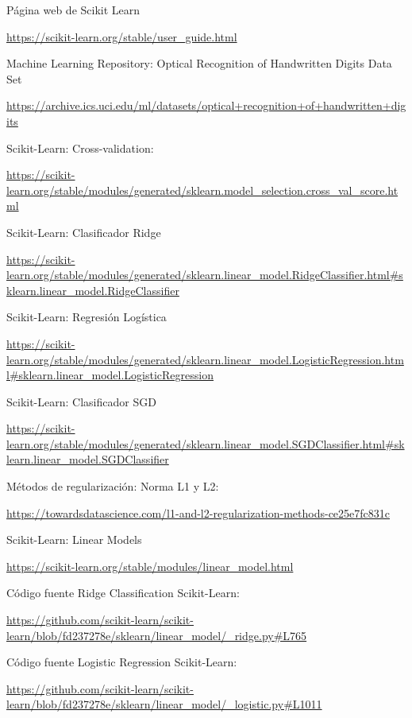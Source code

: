\documentclass[12pt, spanish]{article}
\begin{document}
\begin{thebibliography}{9}


Página web de Scikit Learn

\url{https://scikit-learn.org/stable/user_guide.html}


Machine Learning Repository: Optical Recognition of Handwritten Digits Data Set 

\url{https://archive.ics.uci.edu/ml/datasets/optical+recognition+of+handwritten+digits}


Scikit-Learn: Cross-validation:

\url{https://scikit-learn.org/stable/modules/generated/sklearn.model_selection.cross_val_score.html}



Scikit-Learn: Clasificador Ridge

\url{https://scikit-learn.org/stable/modules/generated/sklearn.linear_model.RidgeClassifier.html#sklearn.linear_model.RidgeClassifier}

Scikit-Learn: Regresión Logística

\url{https://scikit-learn.org/stable/modules/generated/sklearn.linear_model.LogisticRegression.html#sklearn.linear_model.LogisticRegression}

Scikit-Learn: Clasificador SGD 

\url{https://scikit-learn.org/stable/modules/generated/sklearn.linear_model.SGDClassifier.html#sklearn.linear_model.SGDClassifier}


Métodos de regularización: Norma L1 y L2:

\url{https://towardsdatascience.com/l1-and-l2-regularization-methods-ce25e7fc831c}


Scikit-Learn: Linear Models

\url{https://scikit-learn.org/stable/modules/linear_model.html}


Código fuente Ridge Classification Scikit-Learn:

\url{https://github.com/scikit-learn/scikit-learn/blob/fd237278e/sklearn/linear_model/_ridge.py#L765}



Código fuente Logistic Regression Scikit-Learn:

\url{https://github.com/scikit-learn/scikit-learn/blob/fd237278e/sklearn/linear_model/_logistic.py#L1011}




\end{thebibliography}
\end{document}
